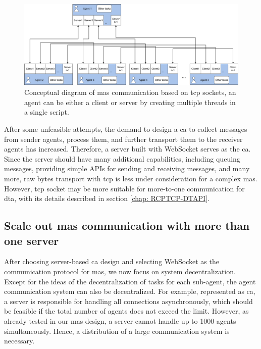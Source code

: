 \begin{figure}[htb]
    \centering
    \includegraphics[width=\textwidth]{figures/methodology/threads_MAS.pdf}

    \caption{Conceptual diagram of \gls{mas} communication based on 
    \gls{tcp} sockets, an agent can be either a client or server by creating 
    multiple threads in a single script. \label{fig: threadMASConceptual}}
\end{figure}



After some unfeasible attempts, the demand to design a \gls{ca} to collect 
messages from sender agents, process them, and further transport them to the 
receiver agents has increased. Therefore, a server built with WebSocket serves 
as the \gls{ca}. Since the server should have many additional 
capabilities, including queuing messages, providing simple APIs for sending 
and receiving messages, and many more, raw bytes transport with \gls{tcp} is 
less under consideration for a complex \gls{mas}. However, \gls{tcp} socket 
may be more suitable for more-to-one communication for \gls{dta}, 
with its details described in section \ref{chap: RCPTCP-DTAPI}.  



\subsection{Scale out \gls{mas} communication with more than one server}
After choosing server-based \gls{ca} design and selecting WebSocket as the 
communication protocol for \gls{mas}, we now focus on system decentralization.  
Except for the ideas of the decentralization of tasks for each sub-agent, the agent 
communication system can also be decentralized. For example, represented as \gls{ca}, 
a server is responsible for handling all connections asynchronously, which should be 
feasible if the total number of agents does not exceed the limit. However, as already 
tested in our \gls{mas} design, a server cannot handle up to 1000 agents simultaneously. 
Hence, a distribution of a large communication system is necessary. 


